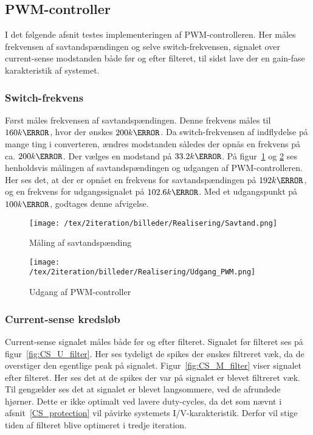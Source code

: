 
\subsection{PWM-controller}
I det følgende afsnit testes implementeringen af PWM-controlleren. Her måles frekvensen af savtandspændingen og selve switch-frekvensen, signalet over current-sense modstanden både før og efter filteret, til sidst lave der en gain-fase karakteristik af systemet.

\subsubsection{Switch-frekvens}
Først måles frekvensen af savtandspændingen. Denne frekvens måles til $160k\hertz$, hvor der ønskes $200k\hertz$. Da switch-frekvensen af indflydelse på mange ting i converteren, ændres modstanden således der opnås en frekvens på ca. $200k\hertz$. Der vælges en modstand på $33.2k\ohm$. På figur~\ref{fig:Savtand} og \ref{fig:Udgang_PWM} ses henholdsvis målingen af savtandspændingen og udgangen af PWM-controlleren. Her ses det, at der er opnået en frekvens for savtandspændingen på $192k\hertz$, og en frekvens for udgangssignalet på $102.6k\hertz$. Med et udgangspunkt på $100k\hertz$, godtages denne afvigelse.

\begin{figure}[H]
	\center
	\texttt{[image: /tex/2iteration/billeder/Realisering/Savtand.png]}
	\caption{Måling af savtandspænding}
	\label{fig:Savtand}
\end{figure} 

\begin{figure}[H]
	\center
	\texttt{[image: /tex/2iteration/billeder/Realisering/Udgang\_PWM.png]}
	\caption{Udgang af PWM-controller}
	\label{fig:Udgang_PWM}
\end{figure} 

\subsubsection{Current-sense kredsløb}
Current-sense signalet måles både før og efter filteret. Signalet før filteret ses på figur~\ref{fig:CS_U_filter}. Her ses tydeligt de spikes der ønskes filtreret væk, da de overstiger den egentlige peak på signalet. Figur~\ref{fig:CS_M_filter} viser signalet efter filteret. Her ses det at de spikes der var på signalet er blevet filtreret væk. Til gengælder ses det at signalet er blevet langsommere, ved de afrundede hjørner. Dette er ikke optimalt ved lavere duty-cycles, da det som nævnt i afsnit~\ref{CS_protection} vil påvirke systemets I/V-karakteristik. Derfor vil stige tiden af filteret blive optimeret i tredje iteration. 

